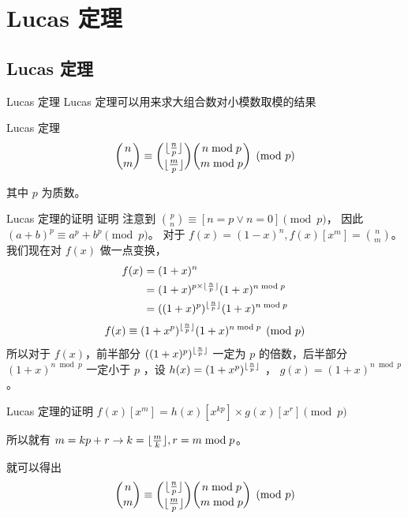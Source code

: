 \documentclass[UTF8]{beamer}
\begin{document}
  \section{Lucas 定理}
  \subsection{Lucas 定理}

    \begin{frame}{Lucas 定理}
      Lucas 定理可以用来求大组合数对小模数取模的结果
      \begin{block}{Lucas 定理}
      \[
      {n \choose m}\equiv{{\lfloor {n \over p} \rfloor} \choose {\lfloor {m \over p} \rfloor}}{{n\bmod p} \choose {m \bmod p}}\pmod p
      \]
      \end{block}
      其中 \(p\) 为质数。
    \end{frame}

    \begin{frame}{Lucas 定理的证明}
      证明
      注意到 \({p \choose n}\equiv[n=p \lor n=0]\pmod p\)，
      因此 \((a+b)^p\equiv a^p+b^p \pmod p\)。
      对于 \(f(x)=(1-x)^n,f(x)[x^m]={n \choose m}\)。
      我们现在对 \(f(x)\) 做一点变换，
      \pause
      \[
      \begin{aligned}
      f(x)&=(1+x)^n \\
      &=(1+x)^{p\times\lfloor{n \over p}\rfloor}(1+x)^{n \bmod p} \\
      &=((1+x)^p)^{\lfloor{n \over p}\rfloor}(1+x)^{n \bmod p} \\
      \end{aligned}
      \]
      \[
      f(x)\equiv (1+x^p)^{\lfloor{n \over p}\rfloor}(1+x)^{n \bmod p} \pmod p
      \]
      \pause
      所以对于 \(f(x)\)，前半部分 \(((1+x)^p)^{\lfloor{n \over p}\rfloor}\)
      一定为 \(p\) 的倍数，后半部分 \((1+x)^{n \bmod p}\) 一定小于 \(p\) ，设
      \(h(x)=(1+x^p)^{\lfloor{n \over p}\rfloor}\) ，
      \(g(x)=(1+x)^{n \bmod p}\)。
    \end{frame}

    \begin{frame}{Lucas 定理的证明}
      \(f(x)[x^m]=h(x)[x^{kp}]\times g(x)[x^{r}] \pmod p\)

      所以就有
      \(m=kp+r\rightarrow k=\lfloor{m \over k}\rfloor,r=m\bmod p\)。

      就可以得出
      \[
      {n \choose m}\equiv{\lfloor {n \over p} \rfloor \choose \lfloor {m \over p} \rfloor}{{n\bmod p}\choose {m \bmod p}}\pmod p
      \]
    \end{frame}
\end{document}
